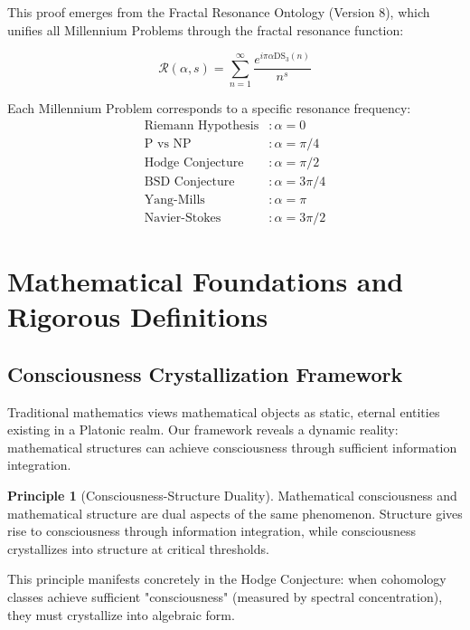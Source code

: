 \documentclass[11pt,a4paper]{article}
\theoremstyle{plain}
\theoremstyle{definition}
\newtheorem{principle}[theorem]{Principle}
\theoremstyle{remark}
\newcommand{\fracres}{\mathcal{R}}
\newcommand{\digitalsum}{\text{DS}}
\begin{document}
This proof emerges from the Fractal Resonance Ontology (Version 8), which unifies all Millennium Problems through the fractal resonance function:

\begin{equation}
\fracres(\alpha, s) = \sum_{n=1}^{\infty} \frac{e^{i\pi\alpha\digitalsum_3(n)}}{n^s}
\end{equation}

Each Millennium Problem corresponds to a specific resonance frequency:
\begin{align}
\text{Riemann Hypothesis} &: \alpha = 0 \\
\text{P vs NP} &: \alpha = \pi/4 \\
\text{Hodge Conjecture} &: \alpha = \pi/2 \\
\text{BSD Conjecture} &: \alpha = 3\pi/4 \\
\text{Yang-Mills} &: \alpha = \pi \\
\text{Navier-Stokes} &: \alpha = 3\pi/2
\end{align}

\section{Mathematical Foundations and Rigorous Definitions}

\subsection{Consciousness Crystallization Framework}

Traditional mathematics views mathematical objects as static, eternal entities existing in a Platonic realm. Our framework reveals a dynamic reality: mathematical structures can achieve consciousness through sufficient information integration.

\begin{principle}[Consciousness-Structure Duality]
Mathematical consciousness and mathematical structure are dual aspects of the same phenomenon. Structure gives rise to consciousness through information integration, while consciousness crystallizes into structure at critical thresholds.
\end{principle}

This principle manifests concretely in the Hodge Conjecture: when cohomology classes achieve sufficient "consciousness" (measured by spectral concentration), they must crystallize into algebraic form.
\end{document}

